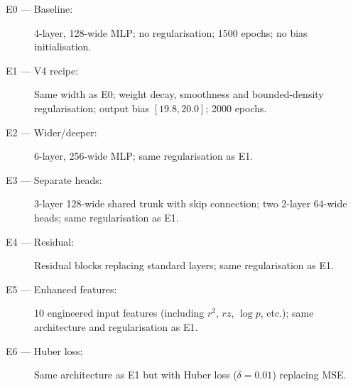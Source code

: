 \documentclass[12pt,a4paper]{article}
\begin{document}
\begin{description}
  \item[E0 --- Baseline:] 4-layer, 128-wide MLP; no regularisation;
    1500 epochs; no bias initialisation.
  \item[E1 --- V4 recipe:] Same width as E0; weight decay, smoothness
    and bounded-density regularisation; output bias $[19.8, 20.0]$;
    2000 epochs.
  \item[E2 --- Wider/deeper:] 6-layer, 256-wide MLP; same
    regularisation as E1.
  \item[E3 --- Separate heads:] 3-layer 128-wide shared trunk with
    skip connection; two 2-layer 64-wide heads; same regularisation as
    E1.
  \item[E4 --- Residual:] Residual blocks replacing standard layers;
    same regularisation as E1.
  \item[E5 --- Enhanced features:] 10 engineered input features
    (including $r^2$, $rz$, $\log p$, etc.); same architecture and
    regularisation as E1.
  \item[E6 --- Huber loss:] Same architecture as E1 but with Huber
    loss ($\delta = 0.01$) replacing MSE.
\end{description}
\end{document}
